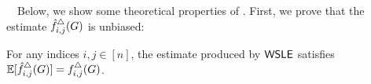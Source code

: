 \smallskip
{}~~Below, we show some theoretical properties of \AlgWSLE{}.
%
First, we prove that
the estimate $\hat{f}_{i,j}^\triangle(G)$
is unbiased:
\begin{theorem}
\label{thm:unbiased_I}
  For any indices $i,j \in [n]$, the estimate produced by
  $\textsf{WSLE}{}$ satisfies $\mathbb{E}[\hat{f}_{i,j}^\triangle(G)] = f_{i,j}^\triangle(G)$.
\end{theorem}


